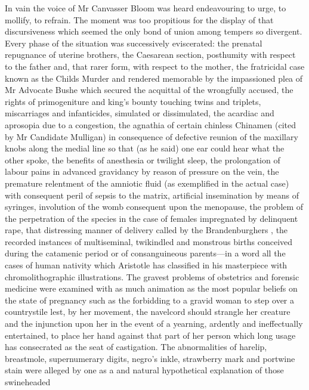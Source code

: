 In vain the voice of Mr
Canvasser Bloom was heard endeavouring to urge,
to mollify,
to refrain.
The moment was too propitious for the display of that discursiveness
which seemed the only bond of union among tempers so divergent.
Every
phase of the situation was successively eviscerated:
the prenatal
repugnance of uterine brothers,
the Caesarean section,
posthumity with
respect to the father and,
that rarer form,
with respect to the mother,
the fratricidal case known as the Childs Murder and rendered memorable by
the impassioned plea of Mr Advocate Bushe which secured the acquittal of
the wrongfully accused,
the rights of primogeniture and king's bounty
touching twins and triplets,
miscarriages and infanticides,
simulated or
dissimulated,
the acardiac  and aprosopia due to a
congestion,
the agnathia of certain chinless Chinamen
(cited by Mr Candidate Mulligan)
in consequence of defective reunion of the maxillary
knobs along the medial line so that
(as he said)
one ear could hear what the other spoke,
the benefits of anesthesia or twilight sleep,
the prolongation of labour pains in advanced gravidancy by reason of pressure on the vein,
the premature relentment of the amniotic fluid
(as exemplified in the actual case)
with consequent peril of sepsis to the matrix,
artificial insemination by means of syringes,
involution of the womb consequent upon the menopause,
the problem of the perpetration of
the species in the case of females impregnated by delinquent rape,
that distressing manner of delivery called
by the Brandenburghers ,
the recorded instances of multiseminal,
twikindled and monstrous births
conceived during the catamenic period or of consanguineous parents---in a
word all the cases of human nativity which Aristotle has classified in
his masterpiece with chromolithographic illustrations.
The gravest
problems of obstetrics and forensic medicine were examined with as much
animation as the most popular beliefs on the state of pregnancy such as
the forbidding to a gravid woman to step over a countrystile lest,
by her movement,
the navelcord should strangle her creature and the injunction
upon her in the event of a yearning,
ardently and ineffectually
entertained,
to place her hand against that part of her person which long
usage has consecrated as the seat of castigation.
The abnormalities of harelip,
breastmole,
supernumerary digits,
negro's inkle,
strawberry mark
and portwine stain were alleged by one as a  and natural
hypothetical explanation of those swineheaded
